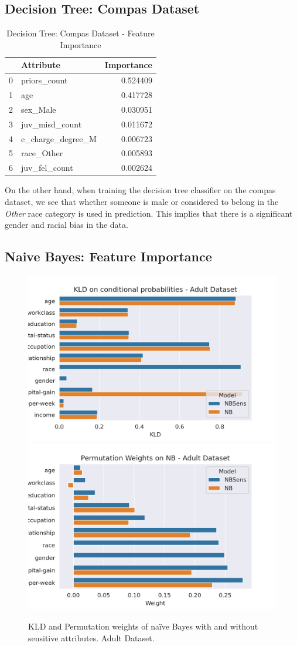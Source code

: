 \subsection{Decision Tree: Compas Dataset}

\begin{table}[]
    \centering
    \begin{tabular}{llr}
    \toprule
    {} &          Attribute &  Importance \\
    \midrule
    0 &       priors\_count &    0.524409 \\
    1 &                age &    0.417728 \\
    2 &           sex\_Male &    0.030951 \\
    3 &     juv\_misd\_count &    0.011672 \\
    4 &  c\_charge\_degree\_M &    0.006723 \\
    5 &         race\_Other &    0.005893 \\
    6 &      juv\_fel\_count &    0.002624 \\
    \bottomrule
    \end{tabular}
    \caption{Decision Tree: Compas Dataset - Feature Importance}
    \label{tab:detreecompasimp}
\end{table}

On the other hand, when training the decision tree classifier on the compas dataset, we see that whether someone is male or considered to belong in the \emph{Other} race category is used in prediction. This implies that there is a significant gender and racial bias in the data.

\subsection{Naive Bayes: Feature Importance}

\begin{figure}
    \centering
    \includegraphics[width=0.49\linewidth]{figures/KLDimportance-adult.png}
    \includegraphics[width=0.49\linewidth]{figures/permimportance-adult.png}
    \caption{KLD and Permutation weights of naïve Bayes with and without sensitive attributes. Adult Dataset.}
    \label{fig:kldpermimpadult}
\end{figure}

